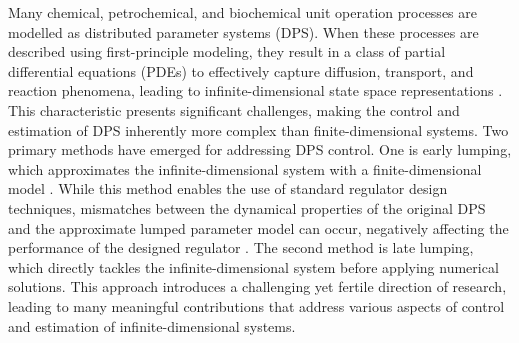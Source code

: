 Many chemical, petrochemical, and biochemical unit operation processes are modelled as distributed parameter systems (DPS). When these processes are described using first-principle modeling, they result in a class of partial differential equations (PDEs) to effectively capture diffusion, transport, and reaction phenomena, leading to infinite-dimensional state space representations \autocite{ray1981advanced}. This characteristic presents significant challenges, making the control and estimation of DPS inherently more complex than finite-dimensional systems. Two primary methods have emerged for addressing DPS control. One is early lumping, which approximates the infinite-dimensional system with a finite-dimensional model \autocite{davison1976robust, francis1977linear}. While this method enables the use of standard regulator design techniques, mismatches between the dynamical properties of the original DPS and the approximate lumped parameter model can occur, negatively affecting the performance of the designed regulator \autocite{moghadam2012infinite}. The second method is late lumping, which directly tackles the infinite-dimensional system before applying numerical solutions. This approach introduces a challenging yet fertile direction of research, leading to many meaningful contributions that address various aspects of control and estimation of infinite-dimensional systems.

